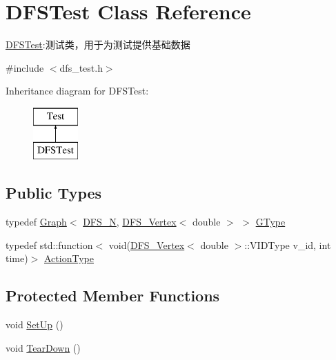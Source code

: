 \hypertarget{class_d_f_s_test}{}\section{D\+F\+S\+Test Class Reference}
\label{class_d_f_s_test}


\hyperlink{class_d_f_s_test}{D\+F\+S\+Test}\+:测试类，用于为测试提供基础数据  




{\ttfamily \#include $<$dfs\+\_\+test.\+h$>$}

Inheritance diagram for D\+F\+S\+Test\+:\begin{figure}[H]
\begin{center}
\leavevmode
\includegraphics[height=2.000000cm]{class_d_f_s_test}
\end{center}
\end{figure}
\subsection*{Public Types}
\begin{DoxyCompactItemize}
\item 
typedef \hyperlink{struct_introduction_to_algorithm_1_1_graph_algorithm_1_1_graph}{Graph}$<$ \hyperlink{dfs__test_8h_a3555131dfa4d016ec8c65706e1835074}{D\+F\+S\+\_\+\+N}, \hyperlink{struct_introduction_to_algorithm_1_1_graph_algorithm_1_1_d_f_s___vertex}{D\+F\+S\+\_\+\+Vertex}$<$ double $>$ $>$ \hyperlink{class_d_f_s_test_a32b63a9c79f6f7e7021daacf076a1512}{G\+Type}
\item 
typedef std\+::function$<$ void(\hyperlink{struct_introduction_to_algorithm_1_1_graph_algorithm_1_1_d_f_s___vertex}{D\+F\+S\+\_\+\+Vertex}$<$ double $>$\+::V\+I\+D\+Type v\+\_\+id, int time)$>$ \hyperlink{class_d_f_s_test_ac4c131b9b4f9de55192b1c634dc1c37f}{Action\+Type}
\end{DoxyCompactItemize}
\subsection*{Protected Member Functions}
\begin{DoxyCompactItemize}
\item 
void \hyperlink{class_d_f_s_test_aa8af56e0d079eb7c2b0ba7b6535d7d61}{Set\+Up} ()
\item 
void \hyperlink{class_d_f_s_test_afbe32ab6557cbca62368b480e1df593a}{Tear\+Down} ()
\end{DoxyCompactItemize}
